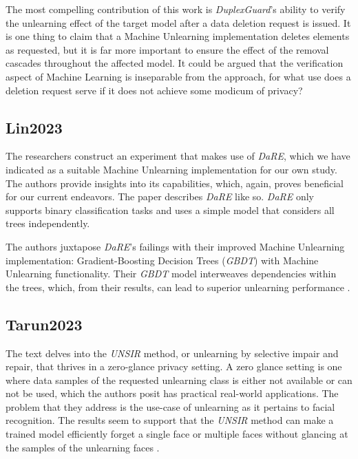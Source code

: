         The most compelling contribution of this work is \textit{DuplexGuard}'s ability to verify the unlearning effect of the target model after a data deletion request is issued. It is one thing to claim that a Machine Unlearning implementation deletes elements as requested, but it is far more important to ensure the effect of the removal cascades throughout the affected model. It could be argued that the verification aspect of Machine Learning is inseparable from the approach, for what use does a deletion request serve if it does not achieve some modicum of privacy?
    
    \subsection{Lin2023}
    \label{subsec:Lin2023}
    
        The researchers construct an experiment that makes use of \textit{DaRE}, which we have indicated as a suitable Machine Unlearning implementation for our own study. The authors provide insights into its capabilities, which, again, proves beneficial for our current endeavors. The paper describes \textit{DaRE} like so. \textit{DaRE} only supports binary classification tasks and uses a simple model that considers all trees independently.
        
        The authors juxtapose \textit{DaRE}'s failings with their improved Machine Unlearning implementation: Gradient-Boosting Decision Trees (\textit{GBDT}) with Machine Unlearning functionality. Their \textit{GBDT} model interweaves dependencies within the trees, which, from their results, can lead to superior unlearning performance \cite{Lin2023}.
    
    \subsection{Tarun2023}
    \label{subsec:Tarun2023}
    
        The text delves into the \textit{UNSIR} method, or unlearning by selective impair and repair, that thrives in a zero-glance privacy setting. A zero glance setting is one where data samples of the requested unlearning class is either not available or can not be used, which the authors posit has practical real-world applications. The problem that they address is the use-case of unlearning as it pertains to facial recognition. The results seem to support that the \textit{UNSIR} method can make a trained model efficiently forget a single face or multiple faces without glancing at the samples of the unlearning faces \cite{Tarun2023}.
        

